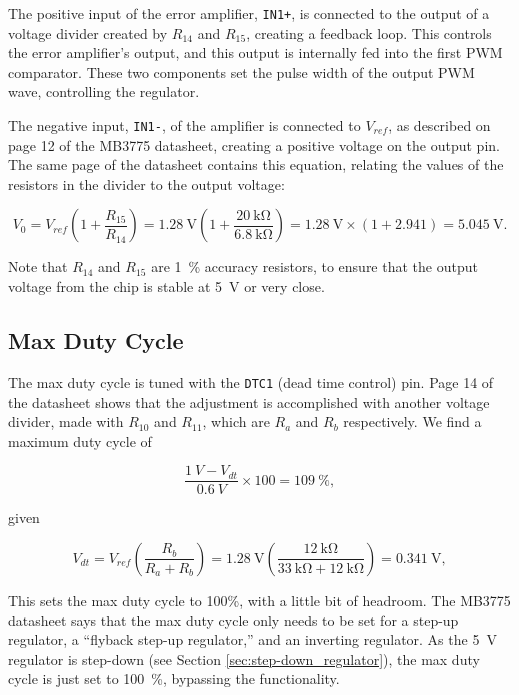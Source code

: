 \documentclass{article}
\newcommand{\Vref}{$V_{ref}$}
\newcommand{\chippin}{\texttt}
\newcommand{\model}{\textsf}
\begin{document}
The positive input of the error amplifier, \chippin{IN1+}, is
connected to the output of a voltage divider created by $R_{14}$ and
$R_{15}$, creating a feedback loop. This controls the error
amplifier's output, and this output is internally fed into the first
PWM comparator. These two components set the pulse width of the output
PWM wave, controlling the regulator.

The negative input, \chippin{IN1-}, of the amplifier is connected to
\Vref, as described on page 12 of the \model{MB3775} datasheet, creating a
positive voltage on the output pin. The same page of the datasheet
contains this equation, relating the values of the resistors in the
divider to the output voltage:

\begin{displaymath}
  V_0 = V_{ref}\left(1+\frac{R_{15}}{R_{14}}\right) =
  \qty{1.28}{\volt}\left(1+\frac{\qty{20}{\kilo\ohm}}{\qty{6.8}{\kilo\ohm}}\right)
  = \qty{1.28}{\volt}\times{}(1+2.941) = \qty{5.045}{\volt}.
\end{displaymath}

Note that $R_{14}$ and $R_{15}$ are \qty{1}{\%} accuracy resistors, to
ensure that the output voltage from the chip is stable at
\qty{5}{\volt} or very close.


\subsection{Max Duty Cycle}
The max duty cycle is tuned with the \chippin{DTC1} (dead time
control) pin. Page 14 of the datasheet shows that the adjustment is
accomplished with another voltage divider, made with $R_{10}$ and
$R_{11}$, which are $R_a$ and $R_b$ respectively. We find a maximum
duty cycle of

\begin{displaymath}
  \frac{\qty{1}{V} - V_{dt}}{\qty{0.6}{V}}
  \times{} 100 = \qty{109}{\%},
\end{displaymath}

\noindent
given

\begin{displaymath}
  V_{dt} = V_{ref}\left(\frac{R_b}{R_a+R_b}\right) =
  \qty{1.28}{\volt}\left(
  \frac{\qty{12}{\kilo\ohm}}{\qty{33}{\kilo\ohm} +
    \qty{12}{\kilo\ohm}}\right) = \qty{0.341}{\volt},
\end{displaymath}

This sets the max duty cycle to 100\%, with a little bit of
headroom. The \model{MB3775} datasheet says that the max duty cycle
only needs to be set for a step-up regulator, a ``flyback step-up
regulator,'' and an inverting regulator. As the \qty{5}{\volt}
regulator is step-down (see Section \ref{sec:step-down_regulator}),
the max duty cycle is just set to \qty{100}{\%}, bypassing the
functionality.
\end{document}
